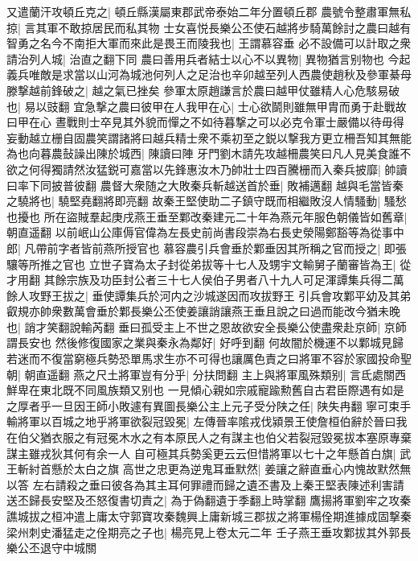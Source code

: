 又遣蘭汗攻頓丘克之|{
	頓丘縣漢屬東郡武帝泰始二年分置頓丘郡}
農號令整肅軍無私掠|{
	言其軍不敢掠居民而私其物}
士女喜悦長樂公丕使石越將步騎萬餘討之農曰越有智勇之名今不南拒大軍而來此是畏王而陵我也|{
	王謂慕容垂}
必不設備可以計取之衆請治列人城|{
	治直之翻下同}
農曰善用兵者結士以心不以異物|{
	異物猶言别物也}
今起義兵唯敵是求當以山河為城池何列人之足治也辛卯越至列人西農使趙秋及參軍綦母滕撃越前鋒破之|{
	越之氣已挫矣}
參軍太原趙謙言於農曰越甲仗雖精人心危駭易破也|{
	易以豉翻}
宜急撃之農曰彼甲在人我甲在心|{
	士心欲鬬則雖無甲胄而勇于赴戰故曰甲在心}
晝戰則士卒見其外貌而憚之不如待暮撃之可以必克令軍士嚴備以待毋得妄動越立栅自固農笑謂諸將曰越兵精士衆不乘初至之鋭以撃我方更立柵吾知其無能為也向暮農鼔譟出陳於城西|{
	陳讀曰陣}
牙門劉木請先攻越柵農笑曰凡人見美食誰不欲之何得獨請然汝猛鋭可嘉當以先鋒惠汝木乃帥壯士四百騰栅而入秦兵披靡|{
	帥讀曰率下同披普彼翻}
農督大衆随之大敗秦兵斬越送首於垂|{
	敗補邁翻}
越與毛當皆秦之驍將也|{
	驍堅堯翻將即亮翻}
故秦王堅使助二子鎮守既而相繼敗沒人情騷動|{
	騷愁也擾也}
所在盜賊羣起庚戌燕王垂至鄴改秦建元二十年為燕元年服色朝儀皆如舊章|{
	朝直遥翻}
以前岷山公庫傉官偉為左長史前尚書段崇為右長史滎陽鄭豁等為從事中郎|{
	凡帶前字者皆前燕所授官也}
慕容農引兵會垂於鄴垂因其所稱之官而授之|{
	即張驤等所推之官也}
立世子寶為太子封從弟拔等十七人及甥宇文輸舅子蘭審皆為王|{
	從才用翻}
其餘宗族及功臣封公者三十七人侯伯子男者八十九人可足渾譚集兵得二萬餘人攻野王拔之|{
	垂使譚集兵於河内之沙城遂因而攻拔野王}
引兵會攻鄴平幼及其弟叡規亦帥衆數萬會垂於鄴長樂公丕使姜讓誚讓燕王垂且說之曰過而能改今猶未晚也|{
	誚才笑翻說輸芮翻}
垂曰孤受主上不世之恩故欲安全長樂公使盡衆赴京師|{
	京師謂長安也}
然後修復國家之業與秦永為鄰好|{
	好呼到翻}
何故闇於機運不以鄴城見歸若迷而不復當窮極兵勢恐單馬求生亦不可得也讓厲色責之曰將軍不容於家國投命聖朝|{
	朝直遥翻}
燕之尺土將軍豈有分乎|{
	分扶問翻}
主上與將軍風殊類别|{
	言氐處關西鮮卑在東北既不同風族類又别也}
一見傾心親如宗戚寵踰勲舊自古君臣際遇有如是之厚者乎一旦因王師小敗遽有異圖長樂公主上元子受分陕之任|{
	陕失冉翻}
寧可束手輸將軍以百城之地乎將軍欲裂冠毀冕|{
	左傳晉率隂戎伐潁景王使詹桓伯辭於晉曰我在伯父猶衣服之有冠冕木水之有本原民人之有謀主也伯父若裂冠毀冕拔本塞原專棄謀主雖戎狄其何有余一人}
自可極其兵勢奚更云云但惜將軍以七十之年懸首白旗|{
	武王斬紂首懸於太白之旗}
高世之忠更為逆鬼耳垂默然|{
	姜讓之辭直垂心内愧故默然無以答}
左右請殺之垂曰彼各為其主耳何罪禮而歸之遺丕書及上秦王堅表陳述利害請送丕歸長安堅及丕怒復書切責之|{
	為于偽翻遺于季翻上時掌翻}
鷹揚將軍劉牢之攻秦譙城拔之桓冲遣上庸太守郭寶攻秦魏興上庸新城三郡拔之將軍楊佺期進據成固撃秦梁州刺史潘猛走之佺期亮之子也|{
	楊亮見上卷太元二年}
壬子燕王垂攻鄴拔其外郭長樂公丕退守中城關

